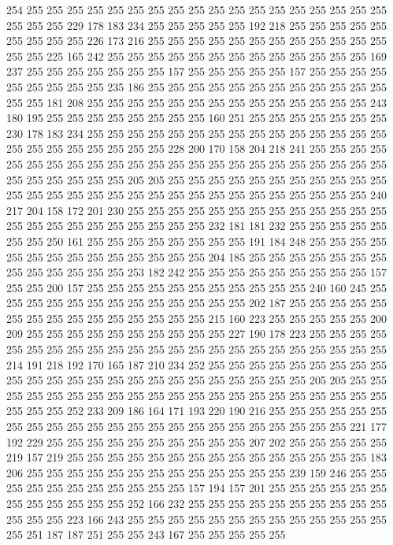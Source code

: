 254 255 255 255 255 255 255 255 255 255 255 255 255 255 255 255 255 255 255 255
255 255 229 178 183 234 255 255 255 255 255 192 218 255 255 255 255 255 255 255
255 255 226 173 216 255 255 255 255 255 255 255 255 255 255 255 255 255 255 225
165 242 255 255 255 255 255 255 255 255 255 255 255 255 255 169 237 255 255 255
255 255 255 255 157 255 255 255 255 255 157 255 255 255 255 255 255 255 255 255
235 186 255 255 255 255 255 255 255 255 255 255 255 255 255 255 181 208 255 255
255 255 255 255 255 255 255 255 255 255 255 255 243 180 195 255 255 255 255 255
255 255 255 160 251 255 255 255 255 255 255 255 230 178 183 234 255 255 255 255
255 255 255 255 255 255 255 255 255 255 255 255 255 255 255 255 255 255 255 228
200 170 158 204 218 241 255 255 255 255 255 255 255 255 255 255 255 255 255 255
255 255 255 255 255 255 255 255 255 255 255 255 255 255 255 205 205 255 255 255
255 255 255 255 255 255 255 255 255 255 255 255 255 255 255 255 255 255 255 255
255 255 255 255 255 255 240 217 204 158 172 201 230 255 255 255 255 255 255 255
255 255 255 255 255 255 255 255 255 255 255 255 255 255 255 255 232 181 181 232
255 255 255 255 255 255 255 250 161 255 255 255 255 255 255 255 255 191 184 248
255 255 255 255 255 255 255 255 255 255 255 255 255 255 204 185 255 255 255 255
255 255 255 255 255 255 255 255 255 253 182 242 255 255 255 255 255 255 255 255
255 157 255 255 200 157 255 255 255 255 255 255 255 255 255 255 255 240 160 245
255 255 255 255 255 255 255 255 255 255 255 255 255 202 187 255 255 255 255 255
255 255 255 255 255 255 255 255 255 255 215 160 223 255 255 255 255 255 200 209
255 255 255 255 255 255 255 255 255 255 227 190 178 223 255 255 255 255 255 255
255 255 255 255 255 255 255 255 255 255 255 255 255 255 255 255 255 214 191 218
192 170 165 187 210 234 252 255 255 255 255 255 255 255 255 255 255 255 255 255
255 255 255 255 255 255 255 255 255 255 255 205 205 255 255 255 255 255 255 255
255 255 255 255 255 255 255 255 255 255 255 255 255 255 255 255 255 252 233 209
186 164 171 193 220 190 216 255 255 255 255 255 255 255 255 255 255 255 255 255
255 255 255 255 255 255 255 255 255 255 221 177 192 229 255 255 255 255 255 255
255 255 255 255 207 202 255 255 255 255 255 219 157 219 255 255 255 255 255 255
255 255 255 255 255 255 255 255 255 183 206 255 255 255 255 255 255 255 255 255
255 255 255 255 239 159 246 255 255 255 255 255 255 255 255 255 255 255 157 194
157 201 255 255 255 255 255 255 255 255 255 255 255 255 252 166 232 255 255 255
255 255 255 255 255 255 255 255 255 255 223 166 243 255 255 255 255 255 255 255
255 255 255 255 255 255 255 251 187 187 251 255 255 243 167 255 255 255 255 255
